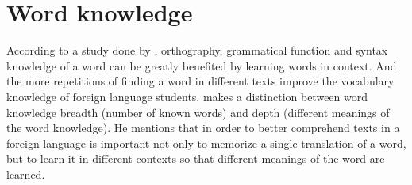 \chapter{Word knowledge}
According to a study done by \citeauthor{Webb2007}, orthography, grammatical function and syntax knowledge of a word can be greatly benefited by learning words in context. And the more repetitions of finding a word in different texts improve the vocabulary knowledge of foreign language students.
\citeauthor{Qian1999} makes a distinction between word knowledge breadth (number of known words) and depth (different meanings of the word knowledge). He mentions that in order to better comprehend texts in a foreign language is important not only to memorize a single translation of a word, but to learn it in different contexts so that different meanings of the word are learned.



